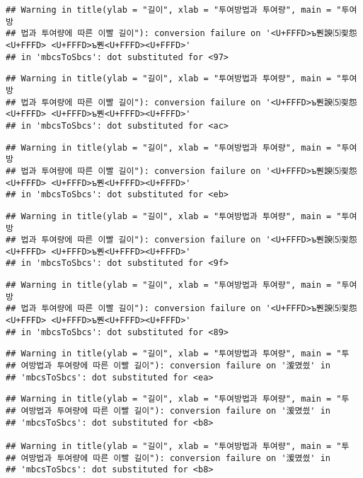 \documentclass[]{article}
\begin{document}
\begin{verbatim}
## Warning in title(ylab = "길이", xlab = "투여방법과 투여량", main = "투여방
## 법과 투여량에 따른 이빨 길이"): conversion failure on '<U+FFFD>ъ뿬諛⑸쾿怨<U+FFFD> <U+FFFD>ъ뿬<U+FFFD><U+FFFD>'
## in 'mbcsToSbcs': dot substituted for <97>
\end{verbatim}

\begin{verbatim}
## Warning in title(ylab = "길이", xlab = "투여방법과 투여량", main = "투여방
## 법과 투여량에 따른 이빨 길이"): conversion failure on '<U+FFFD>ъ뿬諛⑸쾿怨<U+FFFD> <U+FFFD>ъ뿬<U+FFFD><U+FFFD>'
## in 'mbcsToSbcs': dot substituted for <ac>
\end{verbatim}

\begin{verbatim}
## Warning in title(ylab = "길이", xlab = "투여방법과 투여량", main = "투여방
## 법과 투여량에 따른 이빨 길이"): conversion failure on '<U+FFFD>ъ뿬諛⑸쾿怨<U+FFFD> <U+FFFD>ъ뿬<U+FFFD><U+FFFD>'
## in 'mbcsToSbcs': dot substituted for <eb>
\end{verbatim}

\begin{verbatim}
## Warning in title(ylab = "길이", xlab = "투여방법과 투여량", main = "투여방
## 법과 투여량에 따른 이빨 길이"): conversion failure on '<U+FFFD>ъ뿬諛⑸쾿怨<U+FFFD> <U+FFFD>ъ뿬<U+FFFD><U+FFFD>'
## in 'mbcsToSbcs': dot substituted for <9f>
\end{verbatim}

\begin{verbatim}
## Warning in title(ylab = "길이", xlab = "투여방법과 투여량", main = "투여방
## 법과 투여량에 따른 이빨 길이"): conversion failure on '<U+FFFD>ъ뿬諛⑸쾿怨<U+FFFD> <U+FFFD>ъ뿬<U+FFFD><U+FFFD>'
## in 'mbcsToSbcs': dot substituted for <89>
\end{verbatim}

\begin{verbatim}
## Warning in title(ylab = "길이", xlab = "투여방법과 투여량", main = "투
## 여방법과 투여량에 따른 이빨 길이"): conversion failure on '湲몄씠' in
## 'mbcsToSbcs': dot substituted for <ea>
\end{verbatim}

\begin{verbatim}
## Warning in title(ylab = "길이", xlab = "투여방법과 투여량", main = "투
## 여방법과 투여량에 따른 이빨 길이"): conversion failure on '湲몄씠' in
## 'mbcsToSbcs': dot substituted for <b8>

## Warning in title(ylab = "길이", xlab = "투여방법과 투여량", main = "투
## 여방법과 투여량에 따른 이빨 길이"): conversion failure on '湲몄씠' in
## 'mbcsToSbcs': dot substituted for <b8>
\end{verbatim}
\end{document}
